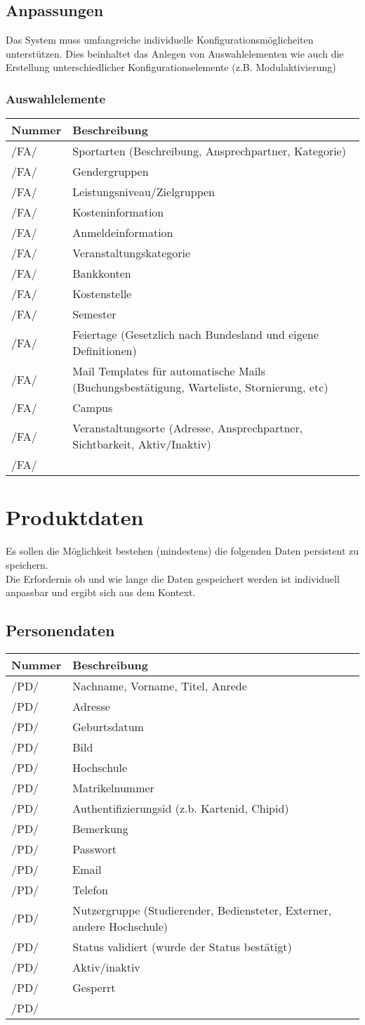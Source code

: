 \documentclass[a4paper,11pt]{article}
\newcommand\addrow[2]{#1 &#2\\ }
\newcommand\addheading[2]{#1 &#2\\ \hline}
\newcommand\tabularhead{\begin{tabular}{lp{13cm}}
\hline
}
\newenvironment{usecase}{\tabularhead}
{\hline\end{tabular}}
\begin{document}
\subsection{Anpassungen}
Das System muss umfangreiche individuelle Konfigurationsmöglicheiten unterstützen. Dies beinhaltet das Anlegen von Auswahlelementen wie auch die Erstellung unterschiedlicher Konfigurationselemente (z.B. Modulaktivierung)
\subsubsection{Auswahlelemente}

\begin{usecase}
  \addheading{Nummer}{Beschreibung} 
  \addrow{/FA/}{Sportarten (Beschreibung, Ansprechpartner, Kategorie)}
  \addrow{/FA/}{Gendergruppen}
  \addrow{/FA/}{Leistungsniveau/Zielgruppen}
  \addrow{/FA/}{Kosteninformation}
  \addrow{/FA/}{Anmeldeinformation}
  \addrow{/FA/}{Veranstaltungskategorie}
  \addrow{/FA/}{Bankkonten}
  \addrow{/FA/}{Kostenstelle}
  \addrow{/FA/}{Semester}
  \addrow{/FA/}{Feiertage (Gesetzlich nach Bundesland und eigene Definitionen)}
  \addrow{/FA/}{Mail Templates für automatische Mails (Buchungsbestätigung, Warteliste, Stornierung, etc)}
  \addrow{/FA/}{Campus}
  \addrow{/FA/}{Veranstaltungsorte (Adresse, Ansprechpartner, Sichtbarkeit, Aktiv/Inaktiv)}
  \addrow{/FA/}{}
\end{usecase}


\section{Produktdaten}
Es sollen die Möglichkeit bestehen (mindestens) die folgenden Daten persistent zu speichern.\\ Die Erfordernis ob und wie lange die Daten gespeichert werden ist individuell anpassbar und ergibt sich aus dem Kontext.\\
\subsection{Personendaten}
\begin{usecase}
  \addheading{Nummer}{Beschreibung} 
  \addrow{/PD/}{Nachname, Vorname, Titel, Anrede}
  \addrow{/PD/}{Adresse}
  \addrow{/PD/}{Geburtsdatum}
  \addrow{/PD/}{Bild}
  \addrow{/PD/}{Hochschule}
  \addrow{/PD/}{Matrikelnummer}
  \addrow{/PD/}{Authentifizierungsid (z.b. Kartenid, Chipid)}
  \addrow{/PD/}{Bemerkung}
  \addrow{/PD/}{Passwort}
  \addrow{/PD/}{Email}
  \addrow{/PD/}{Telefon}
  \addrow{/PD/}{Nutzergruppe (Studierender, Bediensteter, Externer, andere Hochschule)}
  \addrow{/PD/}{Status validiert (wurde der Status bestätigt)}
  \addrow{/PD/}{Aktiv/inaktiv}
  \addrow{/PD/}{Gesperrt}
  \addrow{/PD/}{}
\end{usecase}
\end{document}
